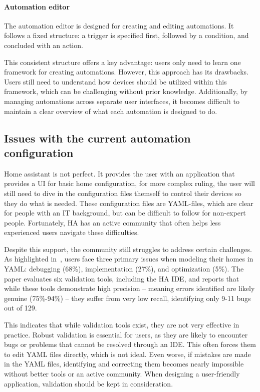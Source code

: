 \documentclass[11pt,a4paper]{report}
\begin{document}
\paragraph{Automation editor}
The automation editor is designed for creating and editing automations. It follows a fixed structure: a trigger is specified first, followed by a condition, and concluded with an action.

This consistent structure offers a key advantage: users only need to learn one framework for creating automations. However, this approach has its drawbacks. Users still need to understand how devices should be utilized within this framework, which can be challenging without prior knowledge. Additionally, by managing automations across separate user interfaces, it becomes difficult to maintain a clear overview of what each automation is designed to do.

\subsection{Issues with the current automation configuration}
\label{home_automation_problems}

Home assistant is not perfect. It provides the user with an application that provides a UI for basic home configuration, for more complex ruling, the user will still need to dive in the configuration files themself to control their devices so they do what is needed. These configuration files are YAML-files, which are clear for people with an IT background, but can be difficult to follow for non-expert people. Fortunately, HA has an active community that often helps less experienced users navigate these difficulties.

Despite this support, the community still struggles to address certain challenges. As highlighted in~\cite{SOTA_AutomationConfigurationSmarthome}, users face three primary issues when modeling their homes in YAML: debugging (68\%), implementation (27\%), and optimization (5\%). The paper evaluates six validation tools, including the HA IDE, and reports that while these tools demonstrate high precision -- meaning errors identified are likely genuine (75\%-94\%) -- they suffer from very low recall, identifying only 9-11 bugs out of 129.

This indicates that while validation tools exist, they are not very effective in practice. Robust validation is essential for users, as they are likely to encounter bugs or problems that cannot be resolved through an IDE. This often forces them to edit YAML files directly, which is not ideal. Even worse, if mistakes are made in the YAML files, identifying and correcting them becomes nearly impossible without better tools or an active community. When designing a user-friendly application, validation should be kept in consideration.
\end{document}
